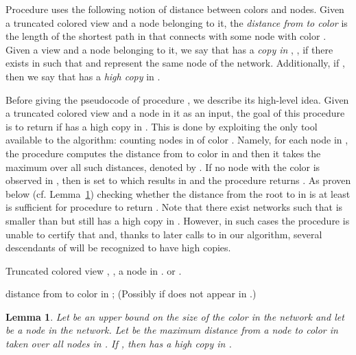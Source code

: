 \documentclass[a4paper,10pt]{article}
\newtheorem{lemma}{Lemma}[section]
\begin{document}
\medskip
Procedure  uses the following notion of distance between colors and nodes.
Given a truncated colored view  and a node  belonging to it, the \emph{distance from  to color } is the length of the shortest path in  that connects  with some node with color .
Given a view  and a node  belonging to it, we say that  has a \emph{copy in} , , if there exists  in  such that  and  represent the same node of the network.
Additionally, if , then we say that  has a \emph{high copy} in .

Before giving the pseudocode of procedure , we describe its high-level idea.
Given a truncated colored view  and a node  in it as an input, the goal of this procedure is to return  if  has a high copy in .
This is done by exploiting the only tool available to the algorithm: counting nodes in  of color .
Namely, for each node  in , the procedure computes the distance from  to color  in  and then it takes the maximum over all such distances, denoted by .
If no node with the color  is observed in , then  is set to  which results in  and the procedure returns .
As proven below (cf. Lemma~\ref{lem:test:bound}) checking whether the distance from the root to  in  is at least  is sufficient for procedure  to return .
Note that there exist networks such that  is smaller than  but  still has a high copy in .
However, in such cases the procedure  is unable to certify that and, thanks to later calls to  in our algorithm, several descendants of  will be recognized to have high copies.





\begin{algorithm} \caption{}
\begin{algorithmic}
\REQUIRE Truncated colored view , , a node  in .
\ENSURE  or .

   \STATE  distance from  to color  in ;
   \STATE (Possibly  if  does not appear in .)
\ENDFOR
\STATE 
\IF{  }
   \RETURN 
\ELSE
   \RETURN 
\ENDIF
\end{algorithmic}
\end{algorithm}

\begin{lemma} \label{lem:test:bound}
Let  be an upper bound on the size of the color  in the network {and let  be a node in the network}.
Let  be the maximum distance from a node  to color  in  taken over all nodes  in .
If , then  has a high copy in .
\end{lemma}
\end{document}
